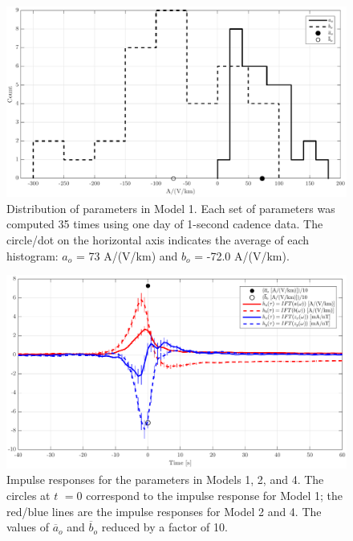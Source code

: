 \documentclass[draft,linenumbers]{agujournal2018}
\begin{document}
\begin{figure}[h]
\centering
\includegraphics[width=\textwidth]{figures/plot_model_summary_aobo_histograms-options-1.pdf}
\caption{Distribution of parameters in Model 1. Each set of parameters was computed 35 times using one day of 1-second cadence data. The circle/dot on the horizontal axis indicates the average of each histogram: $a_o$ = 73 A/(V/km) and $b_o$ = -72.0 A/(V/km).}
\label{histogram}
\end{figure}

\begin{figure}[h]
\centering
\includegraphics[width=\textwidth]{figures/plot_model_summary_H-options-1.pdf}
\caption{Impulse responses for the parameters in Models 1, 2, and 4. The circles at $t$ $=0$ correspond to the impulse response for Model 1; the red/blue lines are the impulse responses for Model 2 and 4. The values of $\overline{a}_o$ and $\overline{b}_o$ reduced by a factor of 10.}
\label{H}
\end{figure}
\end{document}
